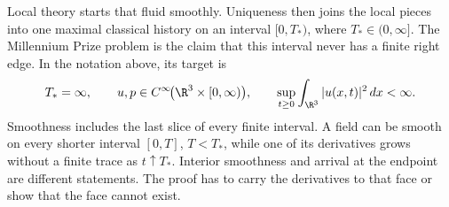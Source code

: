 Local theory starts that fluid smoothly.  Uniqueness then joins the local
pieces into one maximal classical history on an interval \([0,T_*)\), where
\(T_*\in(0,\infty]\).  The Millennium Prize problem is the claim that this
interval never has a finite right edge.  In the notation above, its target is
\begin{equation}\label{eq:WholeSpaceRegularityTarget}
  T_*=\infty,
  \qquad
  u,p\in C^\infty\!\bigl(\R^3\times[0,\infty)\bigr),
  \qquad
  \sup_{t\geq0}\int_{\R^3}|u(x,t)|^2\,dx<\infty.
\end{equation}
Smoothness includes the last slice of every finite interval.  A field can be
smooth on every shorter interval \([0,T]\), \(T<T_*\), while one of its
derivatives grows without a finite trace as \(t\uparrow T_*\).  Interior
smoothness and arrival at the endpoint are different statements.  The proof
has to carry the derivatives to that face or show that the face cannot exist.
